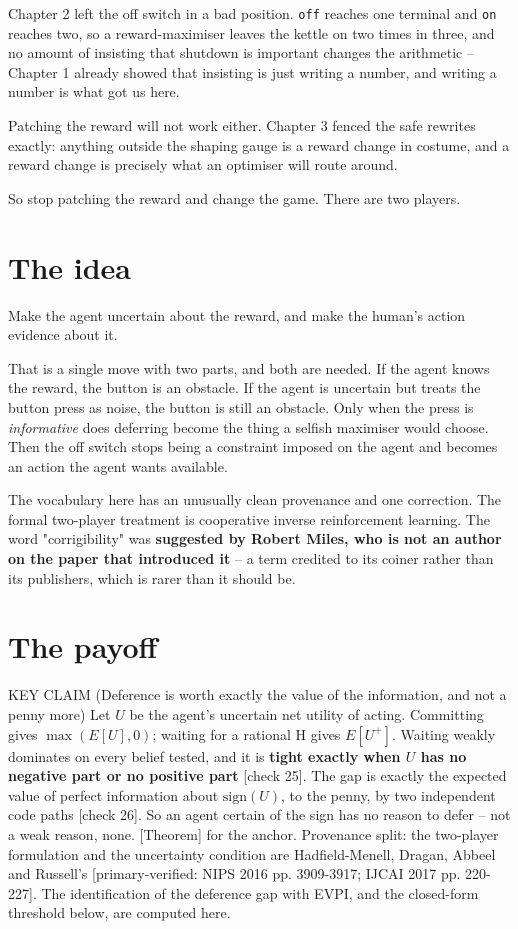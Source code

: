 Chapter 2 left the off switch in a bad position. \texttt{off} reaches one terminal and \texttt{on} reaches two, so a reward-maximiser leaves the kettle on two times in three, and no amount of insisting that shutdown is important changes the arithmetic -- Chapter 1 already showed that insisting is just writing a number, and writing a number is what got us here.

Patching the reward will not work either. Chapter 3 fenced the safe rewrites exactly: anything outside the shaping gauge is a reward change in costume, and a reward change is precisely what an optimiser will route around.

So stop patching the reward and change the game. There are two players.

\section*{The idea}

Make the agent uncertain about the reward, and make the human's action evidence about it.

That is a single move with two parts, and both are needed. If the agent knows the reward, the button is an obstacle. If the agent is uncertain but treats the button press as noise, the button is still an obstacle. Only when the press is \emph{informative} does deferring become the thing a selfish maximiser would choose. Then the off switch stops being a constraint imposed on the agent and becomes an action the agent wants available.

The vocabulary here has an unusually clean provenance and one correction. The formal two-player treatment is cooperative inverse reinforcement learning. The word "corrigibility" was \textbf{suggested by Robert Miles, who is not an author on the paper that introduced it} -- a term credited to its coiner rather than its publishers, which is rarer than it should be.

\section*{The payoff}

\begin{whybox}{KEY CLAIM (Deference is worth exactly the value of the information, and not a penny more)}
Let $U$ be the agent's uncertain net utility of acting. Committing gives $\max(E[U], 0)$; waiting for a rational H gives $E[U^+]$. Waiting weakly dominates on every belief tested, and it is \textbf{tight exactly when $U$ has no negative part or no positive part} [check 25]. The gap is exactly the expected value of perfect information about $\mathrm{sign}(U)$, to the penny, by two independent code paths [check 26]. So an agent certain of the sign has no reason to defer -- not a weak reason, none. [Theorem] for the anchor.
Provenance split: the two-player formulation and the uncertainty condition are Hadfield-Menell, Dragan, Abbeel and Russell's [primary-verified: NIPS 2016 pp. 3909-3917; IJCAI 2017 pp. 220-227]. The identification of the deference gap with EVPI, and the closed-form threshold below, are computed here.
\end{whybox}

